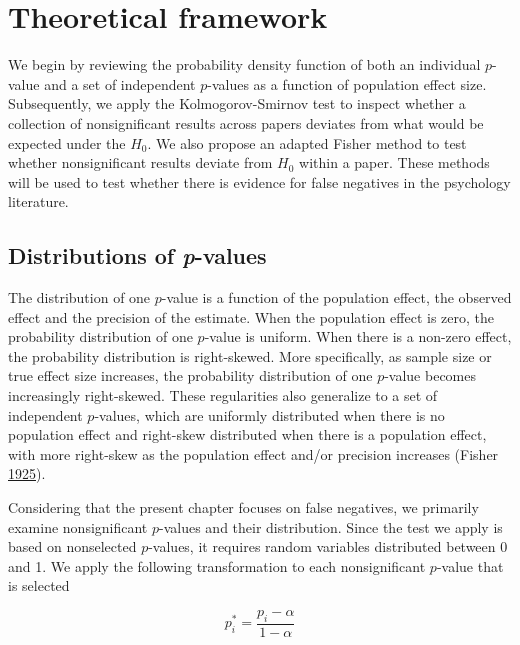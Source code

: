 \documentclass[a5paper]{book}
\begin{document}
\section{Theoretical framework}\label{theoretical-framework}

We begin by reviewing the probability density function of both an
individual \(p\)-value and a set of independent \(p\)-values as a
function of population effect size. Subsequently, we apply the
Kolmogorov-Smirnov test to inspect whether a collection of
nonsignificant results across papers deviates from what would be
expected under the \(H_0\). We also propose an adapted Fisher method to
test whether nonsignificant results deviate from \(H_0\) within a paper.
These methods will be used to test whether there is evidence for false
negatives in the psychology literature.

\subsection{\texorpdfstring{Distributions of
\emph{p}-values}{Distributions of p-values}}\label{distributions-of-p-values}

The distribution of one \(p\)-value is a function of the population
effect, the observed effect and the precision of the estimate. When the
population effect is zero, the probability distribution of one
\(p\)-value is uniform. When there is a non-zero effect, the probability
distribution is right-skewed. More specifically, as sample size or true
effect size increases, the probability distribution of one \(p\)-value
becomes increasingly right-skewed. These regularities also generalize to
a set of independent \(p\)-values, which are uniformly distributed when
there is no population effect and right-skew distributed when there is a
population effect, with more right-skew as the population effect and/or
precision increases (Fisher
\protect\hyperlink{ref-Fisher1925-jl}{1925}).

Considering that the present chapter focuses on false negatives, we
primarily examine nonsignificant \(p\)-values and their distribution.
Since the test we apply is based on nonselected \(p\)-values, it
requires random variables distributed between 0 and 1. We apply the
following transformation to each nonsignificant \(p\)-value that is
selected

\begin{equation}
p^*_i=\frac{p_i-\alpha}{1-\alpha}
\label{eq:pistar}
\end{equation}
\end{document}
